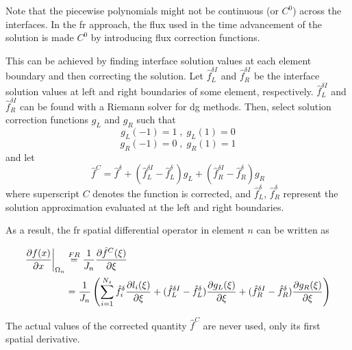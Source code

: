 Note that the piecewise polynomials might not be continuous (or $C^0$) across the interfaces. In the 
\gls{fr} approach, the flux used in the time advancement of the solution is made $C^0$ 
by introducing flux correction functions.

This can be achieved by finding interface solution values at each element boundary and then correcting the 
solution. Let $\hat{f}_L^{\delta I}$ and $\hat{f}_R^{\delta I}$ be the interface solution values at left and right 
boundaries of some element, respectively. $\hat{f}_L^{\delta I}$ and $\hat{f}_R^{\delta I}$ can be found with a Riemann solver for \gls{dg} methods\cite{hesthaven2007nodal}. Then, select solution correction functions $g_L$ and 
$g_R$ such 
that
\begin{equation}\label{eq:condition_hf}
g_L(-1) = 1 \;,\; g_L(1) = 0
\end{equation}
\begin{equation}
g_R(-1) = 0 \;,\; g_R(1) = 1
\end{equation}
and let
\begin{equation}
\hat{f}^C = \hat{f}^\delta + (\hat{f}^{\delta I}_L - \hat{f}^\delta_L) g_L + (\hat{f}^{\delta I}_R 
- \hat{f}^\delta_R) g_R
\end{equation}
where superscript $C$ denotes the function is corrected, and $\hat{f}^\delta_L$, $\hat{f}^\delta_R$ 
represent the solution approximation evaluated at the left and right boundaries.

As a result, the \gls{fr} spatial differential operator in element $n$ can be written as

\begin{equation}
\begin{aligned}
{\frac{\partial f(x)}{\partial x}}\bigg|_{\Omega_n} &\stackrel{FR}{=} \frac{1}{J_n}{\frac{\partial \hat{f}^C(\xi)}{\partial \xi}}\\ &= \frac{1}{J_n}\left(\sum_{i=1}^{N_s} \hat{f}_i^\delta {\frac{\partial l_i(\xi)}{\partial \xi}} + (\hat{f}^{\delta I}_L - \hat{f}^\delta_L) {\frac{\partial g_L(\xi)}{\partial \xi}} + (\hat{f}^{\delta I}_R 
- \hat{f}^\delta_R) {\frac{\partial g_R(\xi)}{\partial \xi}}\right)
\end{aligned}
\end{equation}

The actual values of the corrected quantity $\hat{f}^C$ are never used, only its first spatial derivative.


